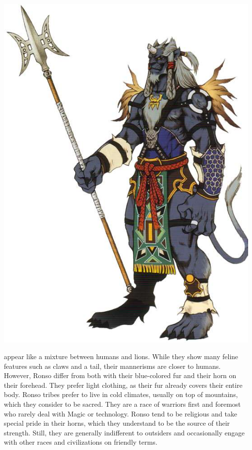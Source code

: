\begin{center} \includegraphics[width=\columnwidth]{./art/races/ronso.jpg} \end{center}
%
 appear like a mixture between humans and lions. 
While they show many feline features such as claws and a tail, their mannerisms are closer to humans.
However, Ronso differ from both with their blue-colored fur and their horn on their forehead.
They prefer light clothing, as their fur already covers their entire body.
Ronso tribes prefer to live in cold climates, usually on top of mountains, which they consider to be sacred.
They are a race of warriors first and foremost who rarely deal with Magic or technology.
Ronso tend to be religious and take special pride in their horns, which they understand to be the source of their strength.
Still, they are generally indifferent to outsiders and occasionally engage with other races and civilizations on friendly terms.
